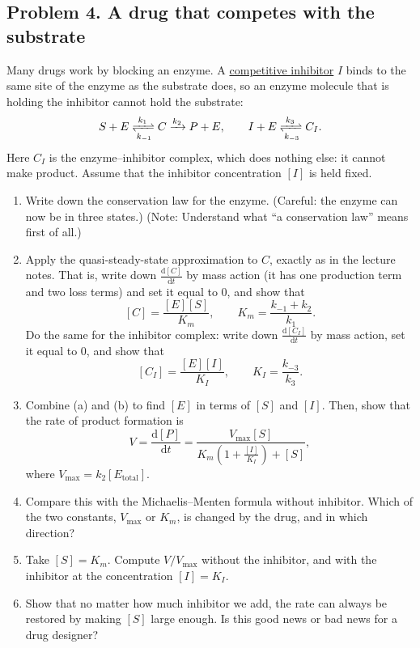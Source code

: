 \documentclass[a4paper,12pt]{article}
\begin{document}
\subsection*{Problem 4. A drug that competes with the substrate}

Many drugs work by blocking an enzyme. A \underline{competitive inhibitor} $I$ binds to the same site of the enzyme as the substrate does, so an enzyme molecule that is holding the inhibitor cannot hold the substrate:
\[
S + E \xrightleftharpoons[k_{-1}]{k_1} C \xrightarrow{k_2} P + E,
\qquad
I + E \xrightleftharpoons[k_{-3}]{k_3} C_I .
\]
Here $C_I$ is the enzyme--inhibitor complex, which does nothing else: it cannot make product. Assume that the inhibitor concentration $[I]$ is held fixed.

\begin{enumerate}[label=(\alph*)]
\item Write down the conservation law for the enzyme. (Careful: the enzyme can now be in three states.) (Note: Understand what ``a conservation law'' means first of all.)

\item Apply the quasi-steady-state approximation to $C$, exactly as in the lecture notes. That is, write down $\frac{\text{d}[C]}{\text{d}t}$ by mass action (it has one production term and two loss terms) and set it equal to $0$, and show that
\[ [C] = \frac{[E][S]}{K_m}, \qquad K_m=\frac{k_{-1}+k_2}{k_1} . \]
Do the same for the inhibitor complex: write down $\frac{\text{d}[C_I]}{\text{d}t}$ by mass action, set it equal to $0$, and show that
\[ [C_I] = \frac{[E][I]}{K_I}, \qquad K_I = \frac{k_{-3}}{k_3} . \]

\item Combine (a) and (b) to find $[E]$ in terms of $[S]$ and $[I]$. Then, show that the rate of product formation is
\[ V = \frac{\text{d}[P]}{\text{d}t} = \frac{V_{\max}[S]}{K_m\left( 1 + \frac{[I]}{K_I} \right) + [S]}, \]
where $V_{\max} = k_2 [E_{\text{total}}]$.

\item Compare this with the Michaelis--Menten formula without inhibitor. Which of the two constants, $V_{\max}$ or $K_m$, is changed by the drug, and in which direction?

\item Take $[S] = K_m$. Compute $V/V_{\max}$ without the inhibitor, and with the inhibitor at the concentration $[I] = K_I$.

\item Show that no matter how much inhibitor we add, the rate can always be restored by making $[S]$ large enough. Is this good news or bad news for a drug designer?
\end{enumerate}
\end{document}
